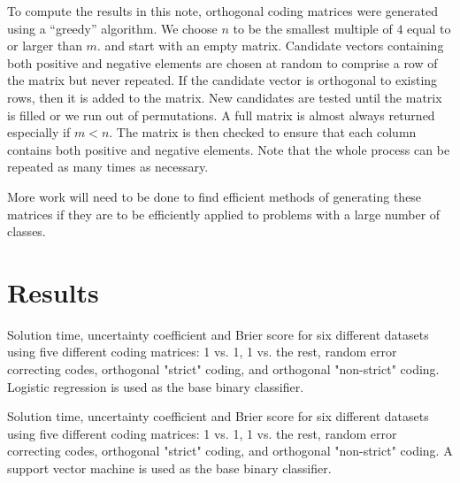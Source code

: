 
To compute the results in this note, orthogonal coding matrices were generated
using a ``greedy'' algorithm.
We choose $n$ to be the smallest multiple of $4$ equal to or larger than $m$.
and start with an empty matrix.
Candidate vectors containing both positive and negative elements 
are chosen at random to comprise a row of the matrix but never repeated.
If the candidate vector is orthogonal to existing rows, then it is added to the matrix.
New candidates are tested until the matrix is filled or we run out of permutations.
A full matrix is almost always returned especially if $m<n$.
The matrix is then checked to ensure that 
each column contains both positive and negative elements.
Note that the whole process can be repeated as many times as necessary.

More work will need to be done to find efficient methods
of generating these matrices
if they are to be efficiently applied to problems with a large number of classes.


\section{Results}

\begin{table*}
\caption{Solution time, uncertainty coefficient and Brier score for six different datasets using five different coding matrices: 1 vs. 1, 1 vs. the rest, random error correcting codes, orthogonal "strict" coding, and orthogonal "non-strict" coding. Logistic regression is used as the base binary classifier.}\label{class_results_lin}

\end{table*}

\begin{table*}
\caption{Solution time, uncertainty coefficient and Brier score for six different datasets using five different coding matrices: 1 vs. 1, 1 vs. the rest, random error correcting codes, orthogonal "strict" coding, and orthogonal "non-strict" coding. A support vector machine is used as the base binary classifier.}\label{class_results_svm}

\end{table*}

